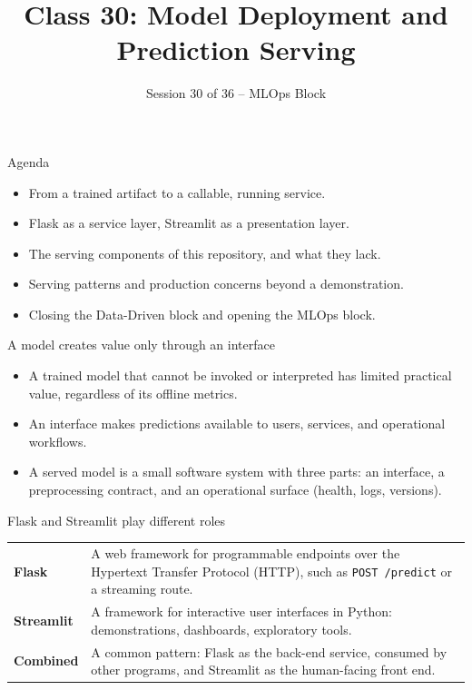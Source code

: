 
\usepackage{amssymb}

\title{Class 30: Model Deployment and Prediction Serving}
\subtitle{Session 30 of 36 -- MLOps Block}
\author{\coursename}
\date{}



\frame{\titlepage \coursefooter}

\begin{frame}{Agenda}
\begin{itemize}
\item From a trained artifact to a callable, running service.
\item Flask as a service layer, Streamlit as a presentation layer.
\item The serving components of this repository, and what they lack.
\item Serving patterns and production concerns beyond a demonstration.
\item Closing the Data-Driven block and opening the MLOps block.
\end{itemize}
\coursefooter
\end{frame}

\begin{frame}{A model creates value only through an interface}
\begin{itemize}
\item A trained model that cannot be invoked or interpreted has limited practical value, regardless of its offline metrics.
\item An interface makes predictions available to users, services, and operational workflows.
\item A served model is a small software system with three parts: an interface, a preprocessing contract, and an operational surface (health, logs, versions).
\end{itemize}
\coursefooter
\end{frame}

\begin{frame}{Flask and Streamlit play different roles}
\begin{tabularx}{\textwidth}{>{\bfseries}l X}
Flask & A web framework for programmable endpoints over the Hypertext Transfer Protocol (HTTP), such as \texttt{POST /predict} or a streaming route. \\
\addlinespace[0.3em]
Streamlit & A framework for interactive user interfaces in Python: demonstrations, dashboards, exploratory tools. \\
\addlinespace[0.3em]
Combined & A common pattern: Flask as the back-end service, consumed by other programs, and Streamlit as the human-facing front end. \\
\bottomrule
\end{tabularx}
\coursefooter
\end{frame}

